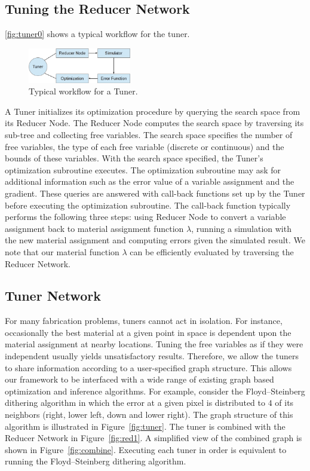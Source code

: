 \documentclass[annual]{acmsiggraph}
\begin{document}
\subsection{Tuning the Reducer Network}
\autoref{fig:tuner0} shows a typical workflow for the tuner.
\begin{figure}
\includegraphics[width=0.4\textwidth]{figure/tuner0.png}
\caption{Typical workflow for a Tuner.}
\label{fig:tuner0}
\end{figure}
A Tuner initializes its optimization procedure by querying the search space from its Reducer Node.
The Reducer Node computes the search space by traversing its sub-tree and collecting
free variables. The search space specifies the number of free variables, the type of each free variable
(discrete or continuous) and the bounds of these variables. 
With the search space specified, the Tuner's optimization subroutine executes.
The optimization subroutine may ask for additional information such as
the error value of a variable assignment and the gradient. These queries are answered
with call-back functions set up by the Tuner before executing the optimization subroutine. 
The call-back function typically performs the following three steps:
using Reducer Node to convert a variable assignment back to material assignment
function $\lambda$, running a simulation with the new material assignment
and computing errors given the simulated result.
We note that our material function $\lambda$ can 
be efficiently evaluated by traversing the Reducer Network.
\subsection{Tuner Network}
For many fabrication problems, tuners cannot act in isolation. For instance,  occasionally the best material at a given point in space is dependent upon the material assignment at nearby locations.  Tuning the free variables as if they were independent usually yields unsatisfactory results. Therefore, we allow the tuners to share information according to a user-specified graph structure.  This allows our framework to be interfaced with a wide range of existing graph based optimization and inference algorithms. For example, consider the Floyd–Steinberg dithering algorithm in which the error at a given pixel is distributed
to $4$ of its neighbors (right, lower left, down and lower right).  The graph structure of this algorithm is illustrated in Figure~\ref{fig:tuner}. The tuner is combined with the Reducer Network in Figure~\ref{fig:red1}. A simplified view of the combined graph is shown in Figure~\ref{fig:combine}. Executing each tuner in order is equivalent to running the Floyd–Steinberg dithering algorithm. 
\end{document}
